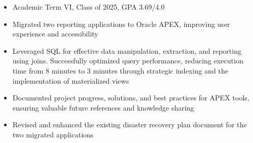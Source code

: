 \documentclass[9.5pt,a4paper]{altacv}
\begin{document}
\tagline{ }


\begin{fullwidth}
\makecvheader
\end{fullwidth}



\begin{itemize}
\item Academic Term VI, Class of 2025, GPA 3.69/4.0
\end{itemize}



\begin{itemize}
\item Migrated two reporting applications to Oracle APEX, improving user experience and accessibility
\item Leveraged SQL for effective data manipulation, extraction, and reporting using joins. Successfully optimized query performance, reducing execution time from 8 minutes to 3 minutes through strategic indexing and the implementation of materialized views
\item Documented project progress, solutions, and best practices for APEX tools, ensuring valuable future references and knowledge sharing
\item Revised and enhanced the existing disaster recovery plan document for the two migrated applications
\end{itemize}
\end{document}
